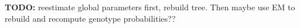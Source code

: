 \documentclass[../../main.tex]{subfiles}
\begin{document}
\textbf{TODO:} reestimate global parameters first, rebuild tree. Then maybe use EM to rebuild and recompute genotype probabilities??

\end{document}

